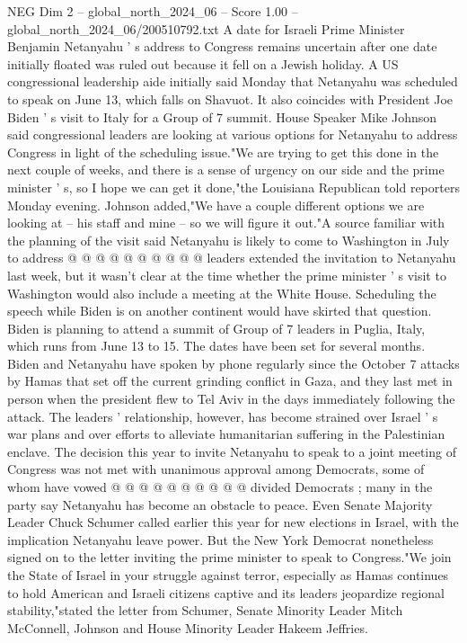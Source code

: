 \begin{textsample}{NEG Dim 2 – global\_north\_2024\_06 – Score 1.00 – global\_north\_2024\_06/200510792.txt}  \label{ex:f2_neg_196}
A date for Israeli Prime Minister Benjamin Netanyahu ' s address to Congress remains uncertain after one date initially floated was ruled out because it fell on a Jewish holiday.
A US congressional leadership aide initially said Monday that Netanyahu was scheduled to speak on June 13, which falls on Shavuot.
It also coincides with President Joe Biden ' s visit to Italy for a Group of 7 summit.
House Speaker Mike Johnson said congressional leaders are looking at various options for Netanyahu to address Congress in light of the scheduling issue."We are trying to get this done in the next couple of weeks, and there is a sense of urgency on our side and the prime minister ' s, so I hope we can get it done,"the Louisiana Republican told reporters Monday evening.
Johnson added,"We have a couple different options we are looking at -- his staff and mine -- so we will figure it out."A source familiar with the planning of the visit said Netanyahu is likely to come to Washington in July to address @ @ @ @ @ @ @ @ @ @ leaders extended the invitation to Netanyahu last week, but it wasn't clear at the time whether the prime minister ' s visit to Washington would also include a meeting at the White House.
Scheduling the speech while Biden is on another continent would have skirted that question.
Biden is planning to attend a summit of Group of 7 leaders in Puglia, Italy, which runs from June 13 to 15.
The dates have been set for several months.
Biden and Netanyahu have spoken by phone regularly since the October 7 attacks by Hamas that set off the current grinding conflict in Gaza, and they last met in person when the president flew to Tel Aviv in the days immediately following the attack.
The leaders ' relationship, however, has become strained over Israel ' s war plans and over efforts to alleviate humanitarian suffering in the Palestinian enclave.
The decision this year to invite Netanyahu to speak to a joint meeting of Congress was not met with unanimous approval among Democrats, some of whom have vowed @ @ @ @ @ @ @ @ @ @ divided Democrats ; many in the party say Netanyahu has become an obstacle to peace.
Even Senate Majority Leader Chuck Schumer called earlier this year for new elections in Israel, with the implication Netanyahu leave power.
But the New York Democrat nonetheless signed on to the letter inviting the prime minister to speak to Congress."We join the State of Israel in your struggle against terror, especially as Hamas continues to hold American and Israeli citizens captive and its leaders jeopardize regional stability,"stated the letter from Schumer, Senate Minority Leader Mitch McConnell, Johnson and House Minority Leader Hakeem Jeffries.

\end{textsample}
